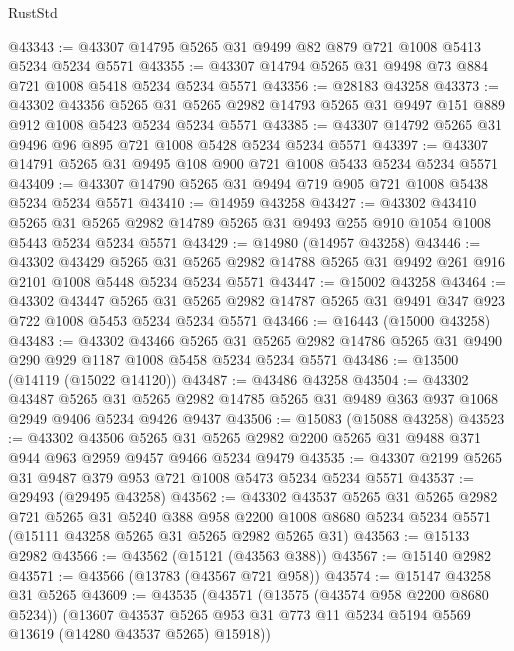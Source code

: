 \begin{lexlean}{RustStd}
\begin{coremodule}
@43343 := @43307 @14795 @5265 @31 @9499 @82 @879 @721 @1008 @5413 @5234 @5234 @5571
@43355 := @43307 @14794 @5265 @31 @9498 @73 @884 @721 @1008 @5418 @5234 @5234 @5571
@43356 := @28183 @43258
@43373 := @43302
    @43356
    @5265
    @31
    @5265
    @2982
    @14793
    @5265
    @31
    @9497
    @151
    @889
    @912
    @1008
    @5423
    @5234
    @5234
    @5571
@43385 := @43307 @14792 @5265 @31 @9496 @96 @895 @721 @1008 @5428 @5234 @5234 @5571
@43397 := @43307 @14791 @5265 @31 @9495 @108 @900 @721 @1008 @5433 @5234 @5234 @5571
@43409 := @43307 @14790 @5265 @31 @9494 @719 @905 @721 @1008 @5438 @5234 @5234 @5571
@43410 := @14959 @43258
@43427 := @43302
    @43410
    @5265
    @31
    @5265
    @2982
    @14789
    @5265
    @31
    @9493
    @255
    @910
    @1054
    @1008
    @5443
    @5234
    @5234
    @5571
@43429 := @14980 (@14957 @43258)
@43446 := @43302
    @43429
    @5265
    @31
    @5265
    @2982
    @14788
    @5265
    @31
    @9492
    @261
    @916
    @2101
    @1008
    @5448
    @5234
    @5234
    @5571
@43447 := @15002 @43258
@43464 := @43302
    @43447
    @5265
    @31
    @5265
    @2982
    @14787
    @5265
    @31
    @9491
    @347
    @923
    @722
    @1008
    @5453
    @5234
    @5234
    @5571
@43466 := @16443 (@15000 @43258)
@43483 := @43302
    @43466
    @5265
    @31
    @5265
    @2982
    @14786
    @5265
    @31
    @9490
    @290
    @929
    @1187
    @1008
    @5458
    @5234
    @5234
    @5571
@43486 := @13500 (@14119 (@15022 @14120))
@43487 := @43486 @43258
@43504 := @43302
    @43487
    @5265
    @31
    @5265
    @2982
    @14785
    @5265
    @31
    @9489
    @363
    @937
    @1068
    @2949
    @9406
    @5234
    @9426
    @9437
@43506 := @15083 (@15088 @43258)
@43523 := @43302
    @43506
    @5265
    @31
    @5265
    @2982
    @2200
    @5265
    @31
    @9488
    @371
    @944
    @963
    @2959
    @9457
    @9466
    @5234
    @9479
@43535 := @43307 @2199 @5265 @31 @9487 @379 @953 @721 @1008 @5473 @5234 @5234 @5571
@43537 := @29493 (@29495 @43258)
@43562 := @43302
    @43537
    @5265
    @31
    @5265
    @2982
    @721
    @5265
    @31
    @5240
    @388
    @958
    @2200
    @1008
    @8680
    @5234
    @5234
    @5571
    (@15111 @43258 @5265 @31 @5265 @2982 @5265 @31)
@43563 := @15133 @2982
@43566 := @43562 (@15121 (@43563 @388))
@43567 := @15140 @2982
@43571 := @43566 (@13783 (@43567 @721 @958))
@43574 := @15147 @43258 @31 @5265
@43609 := @43535
    (@43571
      (@13575 (@43574 @958 @2200 @8680 @5234))
      (@13607 @43537 @5265 @953 @31 @773 @11 @5234 @5194 @5569 @13619 (@14280 @43537 @5265) @15918))

\end{coremodule}
\end{lexlean}
